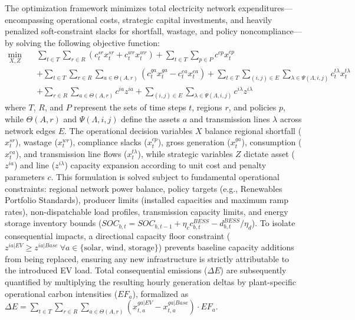 \documentclass[11pt]{article}
\begin{document}
The optimization framework minimizes total electricity network expenditures—encompassing operational costs, strategic capital investments, and heavily penalized soft-constraint slacks for shortfall, wastage, and policy noncompliance—by solving the following objective function:
\begin{equation} \label{eq:objective}
\begin{split}
\min_{X, Z} \quad & \sum_{t \in T}\sum_{r \in R} \left(c^{sr}_t x^{sr}_{t} + c^{wr}_t x^{wr}_{t}\right) + \sum_{t \in T}\sum_{p \in P} c^{cp} x^{cp}_t \\
& + \sum_{t \in T}\sum_{r \in R}\sum_{a \in \Theta(A, r)} \left(c^{ga}_t x^{ga}_t - c^{ea}_t x^{ea}_t \right) + \sum_{t \in T}\sum_{(i, j) \in E}\sum_{\lambda \in \Psi(\Lambda, i, j)} c^{t\lambda}_t x^{t\lambda}_t \\
& + \sum_{r \in R}\sum_{a \in \Theta(A, r)} c^{ia} z^{ia} + \sum_{(i, j) \in E}\sum_{\lambda \in \Psi(\Lambda, i, j)} c^{i\lambda} z^{i\lambda}
\end{split}
\end{equation}
where $T$, $R$, and $P$ represent the sets of time steps $t$, regions $r$, and policies $p$, while $\Theta(A, r)$ and $\Psi(\Lambda, i, j)$ define the assets $a$ and transmission lines $\lambda$ across network edges $E$. The operational decision variables $X$ balance regional shortfall ($x^{sr}_t$), wastage ($x^{wr}_t$), compliance slacks ($x^{cp}_t$), gross generation ($x^{ga}_t$), consumption ($x^{ea}_t$), and transmission line flows ($x^{t\lambda}_t$), while strategic variables $Z$ dictate asset ($z^{ia}$) and line ($z^{i\lambda}$) capacity expansion according to unit cost and penalty parameters $c$. This formulation is solved subject to fundamental operational constraints: regional network power balance, policy targets (e.g., Renewables Portfolio Standards), producer limits (installed capacities and maximum ramp rates), non-dispatchable load profiles, transmission capacity limits, and energy storage inventory bounds ($SOC_{b,t} = SOC_{b,t-1} + \eta_c c^{BESS}_{b,t} - d^{BESS}_{b,t}/\eta_d$). To isolate consequential impacts, a directional capacity floor constraint ($z^{ia|EV} \geq z^{ia|Base} \ \forall a \in \{\text{solar, wind, storage}\}$) prevents baseline capacity additions from being replaced, ensuring any new infrastructure is strictly attributable to the introduced EV load. Total consequential emissions ($\Delta E$) are subsequently quantified by multiplying the resulting hourly generation deltas by plant-specific operational carbon intensities ($EF_a$), formalized as $\Delta E = \sum_{t \in T} \sum_{r \in R} \sum_{a \in \Theta(A, r)} \left( x^{ga|EV}_{t,a} - x^{ga|Base}_{t,a} \right) \cdot EF_a$.
\end{document}
